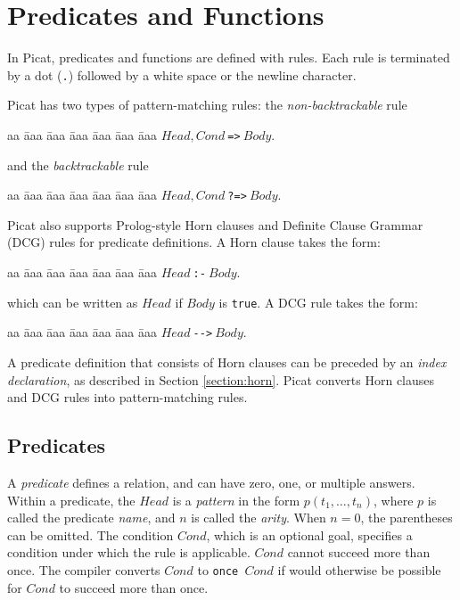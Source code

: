 \chapter{\label{chapter:predicates}Predicates and Functions}
In Picat, predicates and functions are defined with rules. Each rule is terminated by a dot (\verb+.+) followed by a white space or the newline character.

Picat has two types of pattern-matching rules: the \emph{non-backtrackable} rule 
\begin{tabbing}
aa \= aaa \= aaa \= aaa \= aaa \= aaa \= aaa \kill
\> \> $Head, Cond\ $\verb+=>+$\ Body$. 
\end{tabbing}
and the \emph{backtrackable} rule 
\begin{tabbing}
aa \= aaa \= aaa \= aaa \= aaa \= aaa \= aaa \kill
\> \> $Head, Cond\ $\verb+?=>+$\ Body$. 
\end{tabbing}
Picat also supports Prolog-style Horn clauses  and Definite Clause Grammar (DCG) rules  for predicate definitions. A Horn clause takes the form:
\begin{tabbing}
aa \= aaa \= aaa \= aaa \= aaa \= aaa \= aaa \kill
\> \> $Head\ $\verb+:-+$\ Body$. 
\end{tabbing}
which can be written as $Head$ if $Body$ is \texttt{true}. A DCG rule takes the form:
\begin{tabbing}
aa \= aaa \= aaa \= aaa \= aaa \= aaa \= aaa \kill
\> \> $Head\ $\verb+-->+$\ Body$. 
\end{tabbing}
A predicate definition that consists of Horn clauses can be preceded by an \emph{index declaration}, as described in Section \ref{section:horn}. Picat converts Horn clauses and DCG rules into pattern-matching rules.

\section{Predicates}
A \emph{predicate} defines a relation, and can have zero, one, or multiple answers. Within a predicate, the $Head$ is a \emph{pattern} in the form $p(t_1,\ldots,t_n)$, where $p$ is called the predicate \emph{name}, and $n$ is called the \emph{arity}. When $n=0$, the parentheses can be omitted. The condition $Cond$, which is an optional goal, specifies a condition under which the rule is applicable. $Cond$ cannot succeed more than once. The compiler converts $Cond$ to \texttt{once $Cond$} if would otherwise be possible for $Cond$ to succeed more than once.

